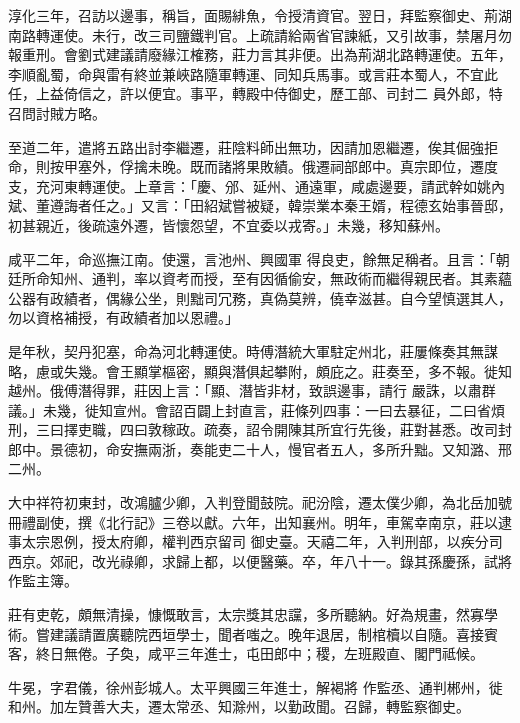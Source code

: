\begin{pinyinscope}
 淳化三年，召訪以邊事，稱旨，面賜緋魚，令授清資官。翌日，拜監察御史、荊湖南路轉運使。未行，改三司鹽鐵判官。上疏請給兩省官諫紙，又引故事，禁屠月勿報重刑。會劉式建議請廢緣江榷務，莊力言其非便。出為荊湖北路轉運使。五年，李順亂蜀，命與雷有終並兼峽路隨軍轉運、同知兵馬事。或言莊本蜀人，不宜此任，上益倚信之，許以便宜。事平，轉殿中侍御史，歷工部、司封二
 員外郎，特召問討賊方略。



 至道二年，遣將五路出討李繼遷，莊陰料師出無功，因請加恩繼遷，俟其倔強拒命，則按甲塞外，俘擒未晚。既而諸將果敗績。俄遷祠部郎中。真宗即位，遷度支，充河東轉運使。上章言：「慶、邠、延州、通遠軍，咸處邊要，請武幹如姚內斌、董遵誨者任之。」又言：「田紹斌嘗被疑，韓崇業本秦王婿，程德玄始事晉邸，初甚親近，後疏遠外遷，皆懷怨望，不宜委以戎寄。」未幾，移知蘇州。



 咸平二年，命巡撫江南。使還，言池州、興國軍
 得良吏，餘無足稱者。且言：「朝廷所命知州、通判，率以資考而授，至有因循偷安，無政術而繼得親民者。其素蘊公器有政績者，偶緣公坐，則黜司冗務，真偽莫辨，僥幸滋甚。自今望慎選其人，勿以資格補授，有政績者加以恩禮。」



 是年秋，契丹犯塞，命為河北轉運使。時傅潛統大軍駐定州北，莊屢條奏其無謀略，慮或失幾。會王顯掌樞密，顯與潛俱起攀附，頗庇之。莊奏至，多不報。徙知越州。俄傅潛得罪，莊因上言：「顯、潛皆非材，致誤邊事，請行
 嚴誅，以肅群議。」未幾，徙知宣州。會詔百闢上封直言，莊條列四事：一曰去暴征，二曰省煩刑，三曰擇吏職，四曰敦稼政。疏奏，詔令開陳其所宜行先後，莊對甚悉。改司封郎中。景德初，命安撫兩浙，奏能吏二十人，慢官者五人，多所升黜。又知潞、邢二州。



 大中祥符初東封，改鴻臚少卿，入判登聞鼓院。祀汾陰，遷太僕少卿，為北岳加號冊禮副使，撰《北行記》三卷以獻。六年，出知襄州。明年，車駕幸南京，莊以逮事太宗恩例，授太府卿，權判西京留司
 御史臺。天禧二年，入判刑部，以疾分司西京。郊祀，改光祿卿，求歸上都，以便醫藥。卒，年八十一。錄其孫慶孫，試將作監主簿。



 莊有吏乾，頗無清操，慷慨敢言，太宗獎其忠讜，多所聽納。好為規畫，然寡學術。嘗建議請置廣聽院西垣學士，聞者嗤之。晚年退居，制棺櫝以自隨。喜接賓客，終日無倦。子奐，咸平三年進士，屯田郎中；稷，左班殿直、閣門祗候。



 牛冕，字君儀，徐州彭城人。太平興國三年進士，解褐將
 作監丞、通判郴州，徙和州。加左贊善大夫，遷太常丞、知滁州，以勤政聞。召歸，轉監察御史。




\end{pinyinscope}

